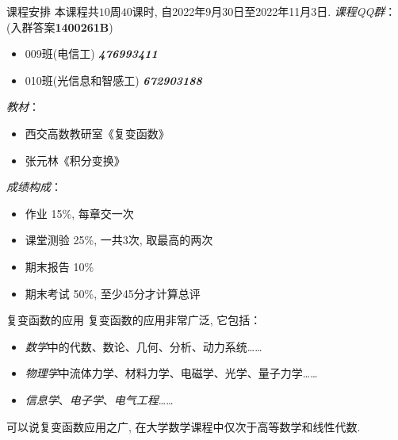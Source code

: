 \begin{frame}{课程安排}
\onslide<+->
本课程共$10$周$40$课时, 自2022年9月30日至2022年11月3日. 
\onslide<+->
\emph{课程QQ群}：(入群答案\textbf{1400261B})
\onslide<+->
\begin{itemize}[<*>]
\item 009班(电信工) \emph{\textbf{476993411}}
\item 010班(光信息和智感工) \emph{\textbf{672903188}}
\end{itemize}
\onslide<+->
\emph{教材}：
\begin{itemize}[<*>]
\item 西交高数教研室《复变函数》
\item 张元林《积分变换》
\end{itemize}
\onslide<+->
\emph{成绩构成}：
\begin{itemize}
\item \alert{作业 15\%}, 每章交一次
\item \alert{课堂测验 25\%}, 一共3次,  取最高的两次
\item \alert{期末报告 10\%}
\item \alert{期末考试 50\%}, 至少45分才计算总评
\end{itemize}
\end{frame}


\begin{frame}{复变函数的应用}
\onslide<+->
复变函数的应用非常广泛, 它包括：
\begin{itemize}
\item \emph{数学}中的代数、数论、几何、分析、动力系统……
\item \emph{物理学}中流体力学、材料力学、电磁学、光学、量子力学……
\item \emph{信息学}、\emph{电子学}、\emph{电气工程}……
\end{itemize}

\onslide<+->
可以说复变函数应用之广, 在大学数学课程中仅次于高等数学和线性代数. 
\end{frame}


